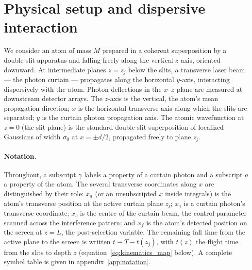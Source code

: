 \documentclass[11pt,a4paper]{article}
\begin{document}
\section{Physical setup and dispersive interaction}
\label{sec:setup}

We consider an atom of mass $M$ prepared in a coherent superposition by a double-slit apparatus and falling freely along the vertical $z$-axis, oriented downward. At intermediate planes $z = z_j$ below the slits, a transverse laser beam --- the photon curtain --- propagates along the horizontal $y$-axis, interacting dispersively with the atom. Photon deflections in the $x$--$z$ plane are measured at downstream detector arrays. The $z$-axis is the vertical, the atom's mean propagation direction; $x$ is the horizontal transverse axis along which the slits are separated; $y$ is the curtain photon propagation axis. The atomic wavefunction at $z = 0$ (the slit plane) is the standard double-slit superposition of localized Gaussians of width $\sigma_0$ at $x = \pm d/2$, propagated freely to plane $z_j$.

\paragraph{Notation.} Throughout, a subscript $\gamma$ labels a property of a curtain photon and a subscript $a$ a property of the atom. The several transverse coordinates along $x$ are distinguished by their role: $x_a$ (or an unsubscripted $x$ inside integrals) is the atom's transverse position at the active curtain plane $z_j$; $x_\gamma$ is a curtain photon's transverse coordinate; $x_c$ is the centre of the curtain beam, the control parameter scanned across the interference pattern; and $x_f$ is the atom's detected position on the screen at $z = L$, the post-selection variable. The remaining fall time from the active plane to the screen is written $t \equiv T - t(z_j)$, with $t(z)$ the flight time from the slits to depth $z$ (equation~\eqref{eq:kinematics_map} below). A complete symbol table is given in appendix~\ref{app:notation}.
\end{document}
